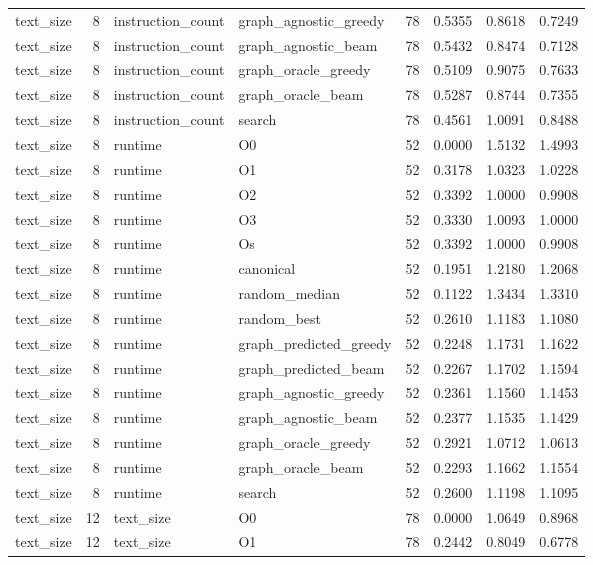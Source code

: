 \begin{table}[t]
\begin{tabular}{lrllrrrr}
text\_size & 8 & instruction\_count & graph\_agnostic\_greedy & 78 & 0.5355 & 0.8618 & 0.7249 \\
text\_size & 8 & instruction\_count & graph\_agnostic\_beam & 78 & 0.5432 & 0.8474 & 0.7128 \\
text\_size & 8 & instruction\_count & graph\_oracle\_greedy & 78 & 0.5109 & 0.9075 & 0.7633 \\
text\_size & 8 & instruction\_count & graph\_oracle\_beam & 78 & 0.5287 & 0.8744 & 0.7355 \\
text\_size & 8 & instruction\_count & search & 78 & 0.4561 & 1.0091 & 0.8488 \\
text\_size & 8 & runtime & O0 & 52 & 0.0000 & 1.5132 & 1.4993 \\
text\_size & 8 & runtime & O1 & 52 & 0.3178 & 1.0323 & 1.0228 \\
text\_size & 8 & runtime & O2 & 52 & 0.3392 & 1.0000 & 0.9908 \\
text\_size & 8 & runtime & O3 & 52 & 0.3330 & 1.0093 & 1.0000 \\
text\_size & 8 & runtime & Os & 52 & 0.3392 & 1.0000 & 0.9908 \\
text\_size & 8 & runtime & canonical & 52 & 0.1951 & 1.2180 & 1.2068 \\
text\_size & 8 & runtime & random\_median & 52 & 0.1122 & 1.3434 & 1.3310 \\
text\_size & 8 & runtime & random\_best & 52 & 0.2610 & 1.1183 & 1.1080 \\
text\_size & 8 & runtime & graph\_predicted\_greedy & 52 & 0.2248 & 1.1731 & 1.1622 \\
text\_size & 8 & runtime & graph\_predicted\_beam & 52 & 0.2267 & 1.1702 & 1.1594 \\
text\_size & 8 & runtime & graph\_agnostic\_greedy & 52 & 0.2361 & 1.1560 & 1.1453 \\
text\_size & 8 & runtime & graph\_agnostic\_beam & 52 & 0.2377 & 1.1535 & 1.1429 \\
text\_size & 8 & runtime & graph\_oracle\_greedy & 52 & 0.2921 & 1.0712 & 1.0613 \\
text\_size & 8 & runtime & graph\_oracle\_beam & 52 & 0.2293 & 1.1662 & 1.1554 \\
text\_size & 8 & runtime & search & 52 & 0.2600 & 1.1198 & 1.1095 \\
text\_size & 12 & text\_size & O0 & 78 & 0.0000 & 1.0649 & 0.8968 \\
text\_size & 12 & text\_size & O1 & 78 & 0.2442 & 0.8049 & 0.6778 \\

\end{tabular}
\end{table}
